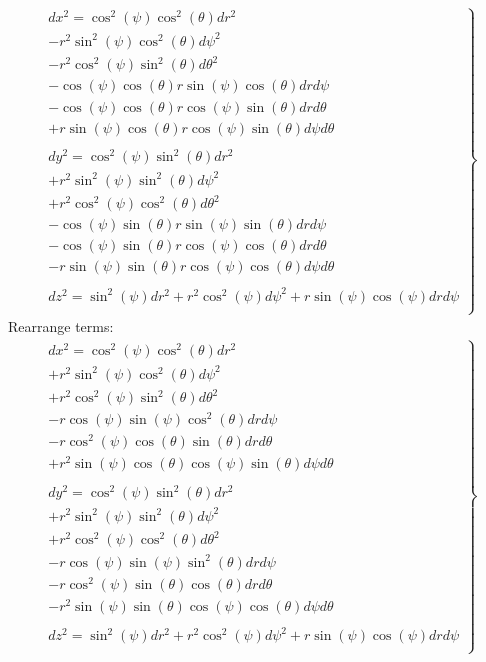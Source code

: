   \begin{align}
  \left.
  \begin{array}{c}
    dx^2=
    \cos^2 (\psi )\cos^2 (\theta)dr^2\\- r^2\sin^2 (\psi )\cos^2 (\theta)d\psi^2\\ -r^2\cos^2 (\psi )\sin^2 (\theta)d\theta^2\\
    -\cos (\psi )\cos (\theta) r\sin (\psi )\cos (\theta)drd\psi\\
    -\cos (\psi )\cos (\theta)r\cos (\psi )\sin (\theta)drd\theta\\
    +r\sin (\psi )\cos (\theta)r\cos (\psi )\sin (\theta)d\psi d\theta  \\\\
     dy^2=  \cos^2 (\psi )\sin^2 (\theta)dr^2\\ +r^2\sin^2 (\psi )\sin^2 (\theta)d\psi^2\\+r^2\cos^2 (\psi )\cos^2 (\theta)d\theta^2\\-\cos (\psi )\sin (\theta)r\sin (\psi )\sin (\theta)dr d\psi\\ - \cos (\psi )\sin (\theta)r\cos (\psi )\cos (\theta)drd\theta\\
     -r\sin (\psi )\sin (\theta)r\cos (\psi )\cos (\theta)d\psi d\theta\\\\
      dz^2= \sin^2(\psi )dr^2 +r^2\cos^2(\psi )d\psi^2 + r\sin(\psi )\cos(\psi )drd\psi\\
  \end{array} \right\}
\end{align}
Rearrange terms:
  \begin{align}
  \left.
  \begin{array}{c}
    dx^2=
    \cos^2 (\psi )\cos^2 (\theta)dr^2\\+ r^2\sin^2 (\psi )\cos^2 (\theta)d\psi^2\\ +r^2\cos^2 (\psi )\sin^2 (\theta)d\theta^2\\
    -r\cos (\psi )\sin (\psi )\cos^2 (\theta)drd\psi\\
    -r\cos^2 (\psi )\cos (\theta)\sin (\theta)drd\theta\\
    +r^2\sin (\psi )\cos (\theta) \cos (\psi )\sin (\theta)d\psi d\theta  \\\\
     dy^2=  \cos^2 (\psi )\sin^2 (\theta)dr^2\\ +r^2\sin^2 (\psi )\sin^2 (\theta)d\psi^2\\+r^2\cos^2 (\psi )\cos^2 (\theta)d\theta^2\\-r\cos (\psi )\sin (\psi )\sin^2 (\theta)dr d\psi\\ - r\cos^2 (\psi )\sin (\theta) \cos (\theta)drd\theta\\
     -r^2\sin (\psi )\sin (\theta)\cos (\psi )\cos (\theta)d\psi d\theta\\\\
      dz^2= \sin^2(\psi )dr^2 +r^2\cos^2(\psi )d\psi^2 + r\sin(\psi )\cos(\psi )drd\psi\\
  \end{array} 
  \right\}
\end{align}
